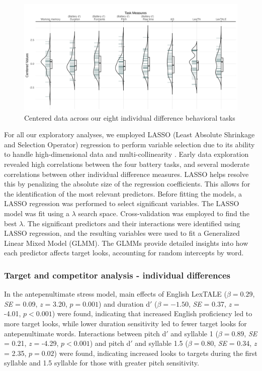 \begin{figure}[H]
  \centering
  \includegraphics[width=1\linewidth]{visuals/plot_raw_task.jpeg}
  \caption{Centered data across our eight individual difference behavioral tasks}
  \label{fig:plot_raw_task}
\end{figure}


For all our exploratory analyses, we employed LASSO (Least Absolute Shrinkage and Selection Operator) regression to perform variable selection due to its ability to handle high-dimensional data and multi-collinearity \citep{Zhang2020, Tibshirani1996}. Early data exploration revealed high correlations between the four battery tasks, and several moderate correlations between other individual difference measures. LASSO helps resolve this by penalizing the absolute size of the regression coefficients. This allows for the identification of the most relevant predictors. Before fitting the models, a LASSO regression was performed to select significant variables. The LASSO model was fit using a $\lambda$ search space. Cross-validation was employed to find the best $\lambda$. The significant predictors and their interactions were identified using LASSO regression, and the resulting variables were used to fit a Generalized Linear Mixed Model (GLMM). The GLMMs provide detailed insights into how each predictor affects target looks, accounting for random intercepts by word.


\subsubsection{Target and competitor analysis - individual differences}

In the antepenultimate stress model, main effects of English LexTALE ($\beta= 0.29$, \textit{SE} = 0.09, \textit{z} = 3.20, $p = 0.001$) and duration d$'$ ($\beta= -1.50$, \textit{SE} = 0.37, \textit{z} = -4.01, $p < 0.001$) were found, indicating that increased English proficiency led to more target looks, while lower duration sensitivity led to fewer target looks for antepenultimate words. Interactions between pitch d$'$ and syllable 1 ($\beta= 0.89$, \textit{SE} = 0.21, \textit{z} = -4.29, $p < 0.001$) and pitch d$'$ and syllable 1.5 ($\beta= 0.80$, \textit{SE} = 0.34, \textit{z} = 2.35, $p = 0.02$) were found, indicating increased looks to targets during the first syllable and 1.5 syllable for those with greater pitch sensitivity.

